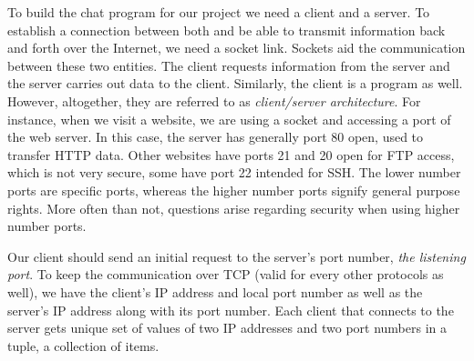 To build the chat program for our project we need a client and a server. To establish a connection between both and be able to transmit information back and forth over the Internet, we need a socket link. Sockets aid the communication between these two entities. The client requests information from the server and the server carries out data to the client. Similarly, the client is a program as well. However, altogether, they are referred to as \emph{client/server architecture}. For instance, when we visit a website, we are using a socket and accessing a port of the web server. In this case, the server has generally port 80 open, used to transfer HTTP data. Other websites have ports 21 and 20 open for FTP access, which is not very secure, some have port 22 intended for SSH. The lower number ports are specific ports, whereas the higher number ports signify general purpose rights. More often than not, questions arise regarding security when using higher number ports. 

Our client should send an initial request to the server's port number, \emph{the listening port}. To keep the communication over TCP (valid for every other protocols as well), we have the client's IP address and local port number as well as the server's IP address along with its port number. Each client that connects to the server gets unique set of values of two IP addresses and two port numbers in a tuple, a collection of items. 